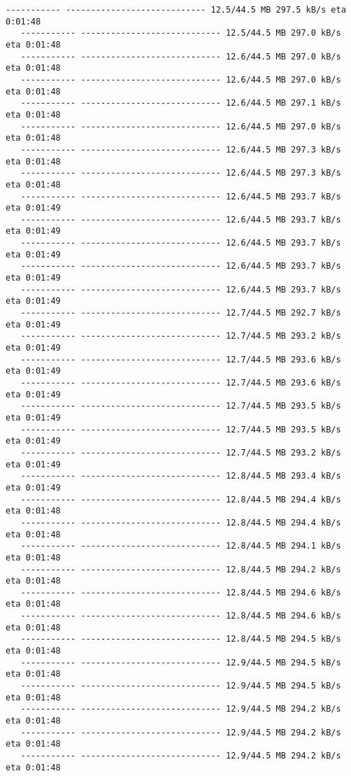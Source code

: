 \documentclass[11pt]{article}
\begin{document}
\begin{Verbatim}[commandchars=\\\{\}]
   ----------- ---------------------------- 12.5/44.5 MB 297.5 kB/s eta 0:01:48
   ----------- ---------------------------- 12.5/44.5 MB 297.0 kB/s eta 0:01:48
   ----------- ---------------------------- 12.6/44.5 MB 297.0 kB/s eta 0:01:48
   ----------- ---------------------------- 12.6/44.5 MB 297.0 kB/s eta 0:01:48
   ----------- ---------------------------- 12.6/44.5 MB 297.1 kB/s eta 0:01:48
   ----------- ---------------------------- 12.6/44.5 MB 297.0 kB/s eta 0:01:48
   ----------- ---------------------------- 12.6/44.5 MB 297.3 kB/s eta 0:01:48
   ----------- ---------------------------- 12.6/44.5 MB 297.3 kB/s eta 0:01:48
   ----------- ---------------------------- 12.6/44.5 MB 293.7 kB/s eta 0:01:49
   ----------- ---------------------------- 12.6/44.5 MB 293.7 kB/s eta 0:01:49
   ----------- ---------------------------- 12.6/44.5 MB 293.7 kB/s eta 0:01:49
   ----------- ---------------------------- 12.6/44.5 MB 293.7 kB/s eta 0:01:49
   ----------- ---------------------------- 12.6/44.5 MB 293.7 kB/s eta 0:01:49
   ----------- ---------------------------- 12.7/44.5 MB 292.7 kB/s eta 0:01:49
   ----------- ---------------------------- 12.7/44.5 MB 293.2 kB/s eta 0:01:49
   ----------- ---------------------------- 12.7/44.5 MB 293.6 kB/s eta 0:01:49
   ----------- ---------------------------- 12.7/44.5 MB 293.6 kB/s eta 0:01:49
   ----------- ---------------------------- 12.7/44.5 MB 293.5 kB/s eta 0:01:49
   ----------- ---------------------------- 12.7/44.5 MB 293.5 kB/s eta 0:01:49
   ----------- ---------------------------- 12.7/44.5 MB 293.2 kB/s eta 0:01:49
   ----------- ---------------------------- 12.8/44.5 MB 293.4 kB/s eta 0:01:49
   ----------- ---------------------------- 12.8/44.5 MB 294.4 kB/s eta 0:01:48
   ----------- ---------------------------- 12.8/44.5 MB 294.4 kB/s eta 0:01:48
   ----------- ---------------------------- 12.8/44.5 MB 294.1 kB/s eta 0:01:48
   ----------- ---------------------------- 12.8/44.5 MB 294.2 kB/s eta 0:01:48
   ----------- ---------------------------- 12.8/44.5 MB 294.6 kB/s eta 0:01:48
   ----------- ---------------------------- 12.8/44.5 MB 294.6 kB/s eta 0:01:48
   ----------- ---------------------------- 12.8/44.5 MB 294.5 kB/s eta 0:01:48
   ----------- ---------------------------- 12.9/44.5 MB 294.5 kB/s eta 0:01:48
   ----------- ---------------------------- 12.9/44.5 MB 294.5 kB/s eta 0:01:48
   ----------- ---------------------------- 12.9/44.5 MB 294.2 kB/s eta 0:01:48
   ----------- ---------------------------- 12.9/44.5 MB 294.2 kB/s eta 0:01:48
   ----------- ---------------------------- 12.9/44.5 MB 294.2 kB/s eta 0:01:48

\end{Verbatim}
\end{document}
